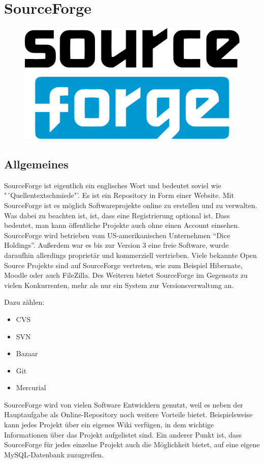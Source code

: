 \documentclass[12pt,a4paper]{article}
\begin{document}
\section{SourceForge}

\begin{figure}[h]
\centering
\includegraphics[width=0.5\linewidth]{sourceforge-logo}
\end{figure}

\subsection{Allgemeines}

SourceForge ist eigentlich ein englisches Wort und bedeutet soviel wie "´Quellentextschmiede"'. Es ist ein Repository in Form einer Website. Mit SourceForge ist es m\"oglich Softwareprojekte online zu erstellen und zu verwalten. Was dabei zu beachten ist, ist, dass eine Registrierung optional ist. Dass bedeutet, man kann \"offentliche Projekte auch ohne einen Account einsehen. SourceForge wird betrieben vom US-amerikanischen Unternehmen "`Dice Holdings"'. Au{\ss}erdem war es bis zur Version 3 eine freie Software, wurde daraufhin allerdings propriet\"ar und kommerziell vertrieben. Viele bekannte Open Source Projekte sind auf SourceForge vertreten, wie zum Beispiel Hibernate, Moodle oder auch FileZilla. Des Weiteren bietet SourceForge im Gegensatz zu vielen Konkurrenten, mehr als nur ein System zur Versionsverwaltung an. 

Dazu z\"ahlen: 
\begin{itemize}
	\item CVS
	\item SVN
	\item Bazaar
	\item Git
	\item Mercurial
\end{itemize}

SourceForge wird von vielen Software Entwicklern genutzt, weil es neben der Hauptaufgabe als Online-Repository noch weitere Vorteile bietet. Beispielsweise kann jedes Projekt \"uber ein eigenes Wiki verf\"ugen, in dem wichtige Informationen \"uber das Projekt aufgelistet sind. Ein anderer Punkt ist, dass SourceForge f\"ur jedes einzelne Projekt auch die M\"oglichkeit bietet, auf eine eigene MySQL-Datenbank zuzugreifen.
\end{document}
